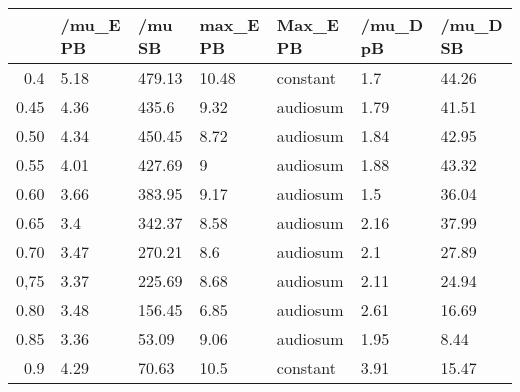 \begin{table}[ht]
\centering
\begin{tabular}{rllllll}
  \hline
 & /mu\_E PB & /mu SB & max\_E PB & Max\_E PB & /mu\_D pB & /mu\_D SB \\ 
  \hline
0.4 & 5.18 & 479.13 & 10.48 & constant & 1.7 & 44.26 \\ 
  0.45 & 4.36 & 435.6 & 9.32 & audiosum & 1.79 & 41.51 \\ 
  0.50 & 4.34 & 450.45 & 8.72 & audiosum & 1.84 & 42.95 \\ 
  0.55 & 4.01 & 427.69 & 9 & audiosum & 1.88 & 43.32 \\ 
  0.60 & 3.66 & 383.95 & 9.17 & audiosum & 1.5 & 36.04 \\ 
  0.65 & 3.4 & 342.37 & 8.58 & audiosum & 2.16 & 37.99 \\ 
  0.70 & 3.47 & 270.21 & 8.6 & audiosum & 2.1 & 27.89 \\ 
  0,75 & 3.37 & 225.69 & 8.68 & audiosum & 2.11 & 24.94 \\ 
  0.80 & 3.48 & 156.45 & 6.85 & audiosum & 2.61 & 16.69 \\ 
  0.85 & 3.36 & 53.09 & 9.06 & audiosum & 1.95 & 8.44 \\ 
  0.9 & 4.29 & 70.63 & 10.5 & constant & 3.91 & 15.47 \\ 
   \hline
\end{tabular}
\end{table}
